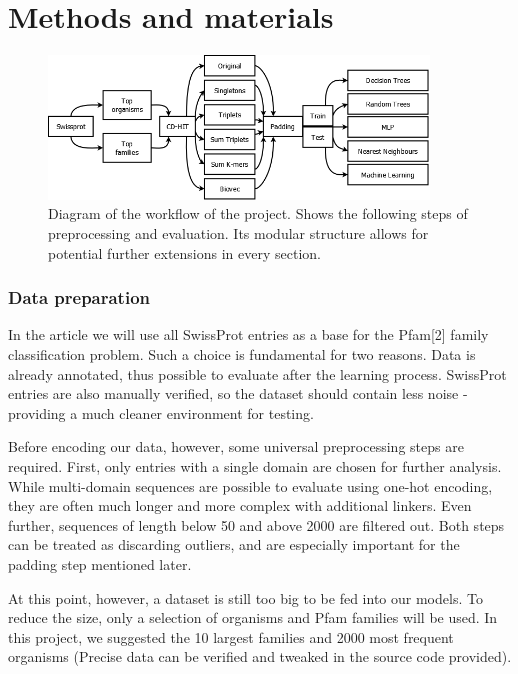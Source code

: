 \documentclass[12pt]{article}
\begin{document}
\section*{Methods and materials}
\begin{figure}[H]
\begin{center}
\includegraphics[width=0.9\textwidth]{workflow}
\caption{Diagram of the workflow of the project. Shows the following steps of preprocessing and evaluation. Its modular structure allows for potential further extensions in every section.}
\end{center}
\end{figure}

\subsubsection*{Data preparation}
In the article we will use all SwissProt entries as a base for the Pfam[2] family classification problem. Such a choice is fundamental for two reasons. Data is already annotated, thus possible to evaluate after the learning process. SwissProt entries are also manually verified, so the dataset should contain less noise - providing a much cleaner environment for testing.

Before encoding our data, however, some universal preprocessing steps are required. First, only entries with a single domain are chosen for further analysis. While multi-domain sequences are possible to evaluate using one-hot encoding, they are often much longer and more complex with additional linkers. 
Even further, sequences of length below 50 and above 2000 are filtered out. Both steps can be treated as discarding outliers, and are especially important for the padding step mentioned later. 

At this point, however, a dataset is still too big to be fed into our models. To reduce the size, only a selection of organisms and Pfam families will be used. In this project, we suggested the 10 largest families and 2000 most frequent organisms (Precise data can be verified and tweaked in the source code provided). 
\end{document}
